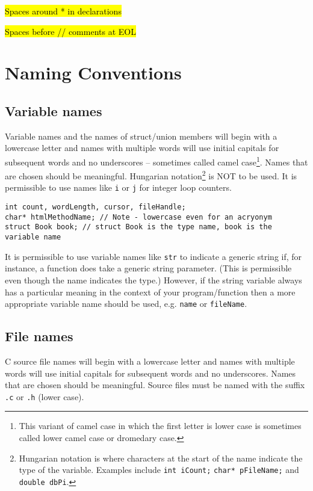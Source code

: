 \documentclass{article}
\begin{document}
\hl{Spaces around * in declarations}

\hl{Spaces before // comments at EOL}

\section{Naming Conventions}
\subsection{Variable names}
\label{sec:naming-variable}
Variable names and the names of struct/union members will begin with a lowercase letter and names with multiple words 
will use initial capitals for subsequent words and no underscores -- sometimes called camel case\footnote{This variant of camel case 
in which the first letter is lower case is sometimes called lower camel case or dromedary case.}. 
Names that are chosen should be meaningful. Hungarian notation\footnote{Hungarian notation is where characters at the start of 
the name indicate the type of the variable. Examples include \texttt{int iCount;} \texttt{char* pFileName;} and
\texttt{double dbPi}.}
 is NOT to be used.
It is permissible to use names like \texttt{i} or \texttt{j} for integer loop counters.
\nolinenumbers
{}
\begin{lstlisting}
int count, wordLength, cursor, fileHandle;
char* htmlMethodName; // Note - lowercase even for an acryonym
struct Book book; // struct Book is the type name, book is the variable name
\end{lstlisting}
\linenumbers


It is permissible to use variable names like \texttt{str} to indicate a generic string if, for instance, a function does take a generic
string parameter. (This is permissible even though the name indicates the type.) However, if the string variable always has a particular meaning in the context of your program/function then a more appropriate variable name should
be used, e.g. \texttt{name} or \texttt{fileName}.
\subsection{File names}
\label{sec:naming-files}
C source file names will begin with a lowercase letter and names with multiple words 
will use initial capitals for subsequent words and no underscores. 
Names that are chosen should be meaningful. Source files must be named with the suffix \texttt{.c} or \texttt{.h} (lower case).
\end{document}
